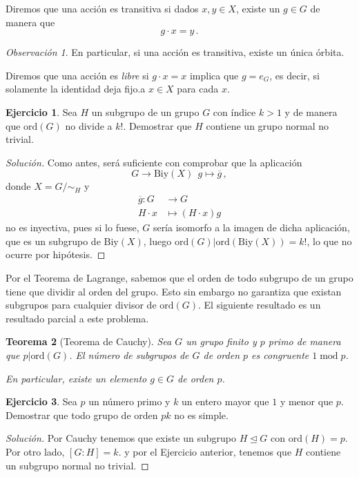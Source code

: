 \documentclass[a4paper,11pt]{amsart}
\theoremstyle{plain}
\newtheorem{thm}{Teorema}[section]
\theoremstyle{definition}
\newtheorem{ejercicio}[thm]{Ejercicio}
\theoremstyle{remark}
\newtheorem*{rem}{Observación}
\newenvironment{solution}
  {\begin{proof}[Solución]}
  {\end{proof}}
\begin{document}
Diremos que una acción es transitiva si dados $x, y \in X$, existe un $g \in G$ de manera que 
\[ g \cdot x = y \, . \]
\begin{rem}
En particular, si una acción es transitiva, existe un única órbita. 
\end{rem}

Diremos que una acción es \textit{libre} si $g \cdot x = x$ implica que $g = e_G$, es decir, si solamente la identidad deja fijo.a $x \in X$ para cada $x$. 


\begin{ejercicio}
Sea $H$ un subgrupo de un grupo $G$ con índice $k > 1$ y de manera que $\text{ord}(G)$ no divide a $k!$. Demostrar que $H$ contiene un grupo normal no trivial.
\end{ejercicio}
\begin{solution}
Como antes, será suficiente con comprobar que la aplicación
\[ G \to \text{Biy}(X) \, \; g \mapsto \overline{g}\, , \]
donde $X = G/\sim_H$ y
\begin{align*}
    \overline{g} \colon G& \to G \\
    H \cdot x & \mapsto (H \cdot x)g
\end{align*}
no es inyectiva, pues si lo fuese, $G$ sería isomorfo a la imagen de dicha aplicación, que es un subgrupo de $\text{Biy}(X)$, luego $\text{ord}(G) | \text{ord}(\text{Biy}(X)) = k!$, lo que no ocurre por hipótesis.
\end{solution}

Por el Teorema de Lagrange, sabemos que el orden de todo subgrupo de un grupo tiene que dividir al orden del grupo. Esto sin embargo no garantiza que existan subgrupos para cualquier divisor de $\text{ord}(G)$. El siguiente resultado es un resultado parcial a este problema.

\begin{thm}[Teorema de Cauchy]
Sea $G$ un grupo finito y $p$ primo de manera que $p | \text{ord}(G)$. El número de subgrupos de $G$ de orden $p$ es congruente $1 \; \text{mod}\; p$. 

En particular, existe un elemento $g \in G$ de orden $p$.
\end{thm}

\begin{ejercicio}
Sea $p$ un número primo y $k$ un entero mayor que $1$ y menor que $p$. Demostrar que todo grupo de orden $pk$ no es simple. 
\end{ejercicio}

\begin{solution}
Por Cauchy tenemos que existe un subgrupo $H \unlhd G$ con $\text{ord}(H) = p$. Por otro lado, $[G : H] = k$. y por el Ejercicio anterior, tenemos que  $H$ contiene un subgrupo normal no trivial.
\end{solution}
\end{document}
